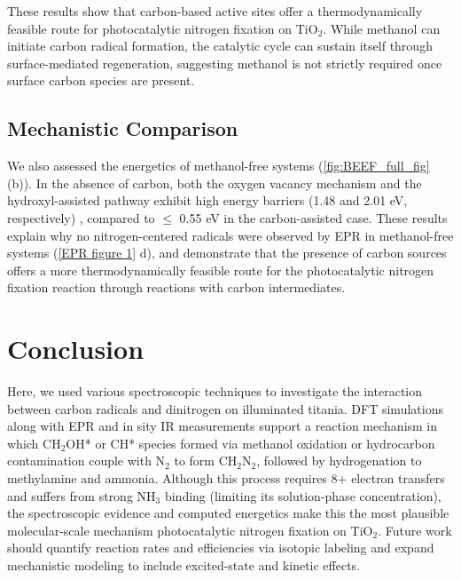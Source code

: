 These results show that carbon-based active sites offer a thermodynamically feasible route for photocatalytic nitrogen fixation on TiO$_2$. While methanol can initiate carbon radical formation, the catalytic cycle can sustain itself through surface-mediated regeneration, suggesting methanol is not strictly required once surface carbon species are present.


\subsection{Mechanistic Comparison}

We also assessed the energetics of methanol-free systems (\ref{fig:BEEF_full_fig} (b)). In the absence of carbon, both the oxygen vacancy mechanism and the hydroxyl-assisted pathway exhibit high energy barriers (1.48 and 2.01 eV, respectively) \cite{xie2019probing}, compared to $\leq$ 0.55 eV in the carbon-assisted case. These results explain why no nitrogen-centered radicals were observed by EPR in methanol-free systems (\ref{EPR figure 1} d), and demonstrate that the presence of carbon sources offers a more thermodynamically feasible route for the photocatalytic nitrogen fixation reaction through reactions with carbon intermediates.

\section{Conclusion}
Here, we used various spectroscopic techniques to investigate the interaction between carbon radicals and dinitrogen on illuminated titania. DFT simulations along with EPR and in sity IR measurements support a reaction mechanism in which CH$_2$OH* or CH* species formed via methanol oxidation or hydrocarbon contamination couple with N$_2$ to form CH$_2$N$_2$, followed by hydrogenation to methylamine and ammonia. Although this process requires 8+ electron transfers and suffers from strong NH$_3$ binding (limiting its solution-phase concentration), the spectroscopic evidence and computed energetics make this the most plausible molecular-scale mechanism photocatalytic nitrogen fixation on TiO$_2$. Future work should quantify reaction rates and efficiencies via isotopic labeling and expand mechanistic modeling to include excited-state and kinetic effects.





